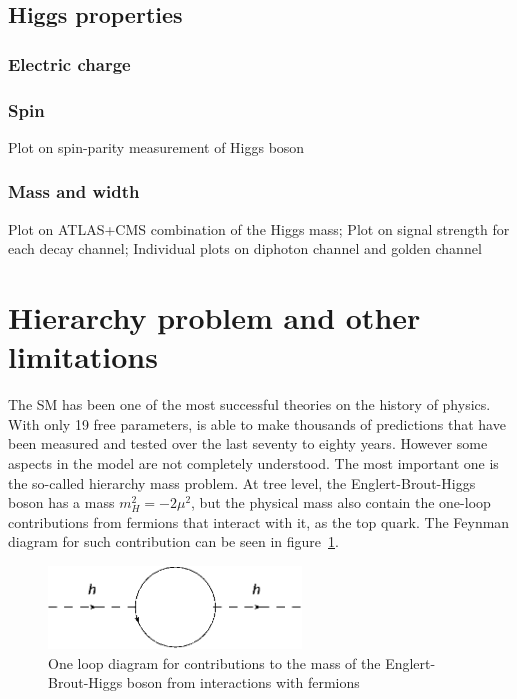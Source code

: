 \subsection{Higgs properties}

\subsubsection{Electric charge}

\subsubsection{Spin}

\begin{TOINCLUDE}Plot on spin-parity measurement of Higgs boson\end{TOINCLUDE}

\subsubsection{Mass and width}

\begin{TOINCLUDE}Plot on ATLAS+CMS combination of the Higgs mass; Plot on signal strength for each decay channel; Individual plots on diphoton channel and golden channel\end{TOINCLUDE}

\section{Hierarchy problem and other limitations}
\label{sec:hier}

The SM has been one of the most successful theories on the history of physics. With only 19 free parameters, is able to make thousands of predictions that have been measured and tested over the last seventy to eighty years. However some aspects in the model are not completely understood. The most important one is the so-called hierarchy mass problem. At tree level, the Englert-Brout-Higgs boson has a mass $m_{H}^{2}=-2\mu^{2}$, but the physical mass also contain the one-loop contributions from fermions that interact with it, as the top quark. The Feynman diagram for such contribution can be seen in figure~\ref{fig:oneloophiggs}.

\begin{figure}[!Hhtbp]
  \begin{center}
    \includegraphics[width=0.6\textwidth]{figs/HierarchyLoop.png}
    \caption{One loop diagram for contributions to the mass of the Englert-Brout-Higgs boson from interactions with fermions}
    \label{fig:oneloophiggs}
  \end{center}
\end{figure}

